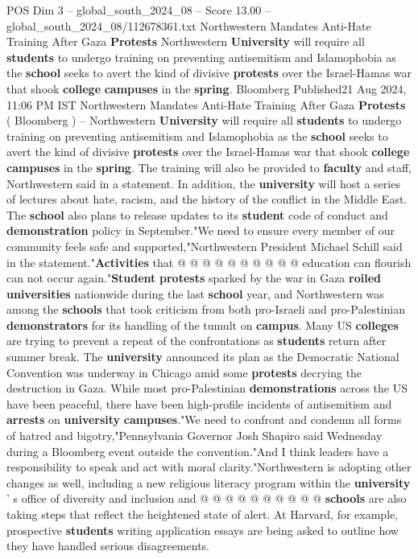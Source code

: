 \begin{textsample}{POS Dim 3 – global\_south\_2024\_08 – Score 13.00 – global\_south\_2024\_08/112678361.txt}  \label{ex:f3_pos_335}
Northwestern Mandates Anti-Hate Training After Gaza \textbf{Protests} Northwestern \textbf{University} will require all \textbf{students} to undergo training on preventing antisemitism and Islamophobia as the \textbf{school} seeks to avert the kind of divisive \textbf{protests} over the Israel-Hamas war that shook \textbf{college} \textbf{campuses} in the \textbf{spring}.
Bloomberg Published21 Aug 2024, 11:06 PM IST Northwestern Mandates Anti-Hate Training After Gaza \textbf{Protests} ( Bloomberg ) -- Northwestern \textbf{University} will require all \textbf{students} to undergo training on preventing antisemitism and Islamophobia as the \textbf{school} seeks to avert the kind of divisive \textbf{protests} over the Israel-Hamas war that shook \textbf{college} \textbf{campuses} in the \textbf{spring}.
The training will also be provided to \textbf{faculty} and staff, Northwestern said in a statement.
In addition, the \textbf{university} will host a series of lectures about hate, racism, and the history of the conflict in the Middle East.
The \textbf{school} also plans to release updates to its \textbf{student} code of conduct and \textbf{demonstration} policy in September."We need to ensure every member of our community feels safe and supported,"Northwestern President Michael Schill said in the statement."\textbf{Activities} that @ @ @ @ @ @ @ @ @ @ education can flourish can not occur again."\textbf{Student} \textbf{protests} sparked by the war in Gaza \textbf{roiled} \textbf{universities} nationwide during the last \textbf{school} year, and Northwestern was among the \textbf{schools} that took criticism from both pro-Israeli and pro-Palestinian \textbf{demonstrators} for its handling of the tumult on \textbf{campus}.
Many US \textbf{colleges} are trying to prevent a repeat of the confrontations as \textbf{students} return after summer break.
The \textbf{university} announced its plan as the Democratic National Convention was underway in Chicago amid some \textbf{protests} decrying the destruction in Gaza.
While most pro-Palestinian \textbf{demonstrations} across the US have been peaceful, there have been high-profile incidents of antisemitism and \textbf{arrests} on \textbf{university} \textbf{campuses}."We need to confront and condemn all forms of hatred and bigotry,"Pennsylvania Governor Josh Shapiro said Wednesday during a Bloomberg event outside the convention."And I think leaders have a responsibility to speak and act with moral clarity."Northwestern is adopting other changes as well, including a new religious literacy program within the \textbf{university} ' s office of diversity and inclusion and @ @ @ @ @ @ @ @ @ @ \textbf{schools} are also taking steps that reflect the heightened state of alert.
At Harvard, for example, prospective \textbf{students} writing application essays are being asked to outline how they have handled serious disagreements.

\end{textsample}
